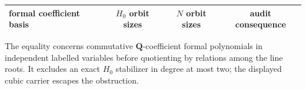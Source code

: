 \begingroup
\small
\setlength{\tabcolsep}{5pt}
\renewcommand{\arraystretch}{1.18}
\begin{tabularx}{\textwidth}{@{}Yccc@{}}
\toprule
formal coefficient basis & $H_0$ orbit sizes & $N$ orbit sizes & audit consequence \\
\midrule
%
\end{tabularx}
\par\smallskip
\footnotesize The equality concerns commutative $\mathbf Q$-coefficient formal
polynomials in independent labelled variables before quotienting by relations
among the line roots.  It excludes an exact $H_0$ stabilizer in degree at most
two; the displayed cubic carrier escapes the obstruction.
\endgroup
